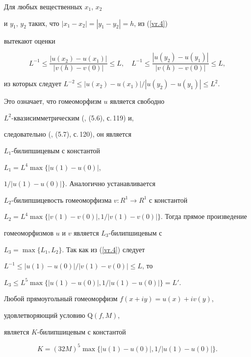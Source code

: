 \begin{pf}


Для любых вещественных $x_1$, $x_2$


и $y_1$, $y_2$ таких, что $|x_1 - x_2| = |y_1 - y_2| =h$, из (\ref{vr.4}) 


вытекают оценки


$$


L^{-1}\leq \frac{|u(x_2) - u(x_1)|}{|v(h) - v(0)|} \leq L,\quad


L^{-1}\leq \frac{|u(y_2) - u(y_1)|}{|v(h) - v(0)|} \leq L,


$$


из которых следует $L^{-2}\leq |u(x_2)-u(x_1)|/|u(y_2)-u(y_1)| \leq L^2$. 


Это означает, что гомеоморфизм $u$ является свободно 


$L^2$-квазисимметрическим (\cite{AsVV}, (5.6), с.\,119) и, 


следовательно (\cite{AsVV}, (5.7), с.\,120), он является 


$L_1$-билипшицевым с константой 


$L_1 = L^4\max\{ |u(1)-u(0)|$,


$1/|u(1)-u(0)|\} $. Аналогично устанавливается 


$L_2$-билипшицевость гомеоморфизма $v: R^1 \to R^1$ с константой 


$L_2 = L^4 \max\{ |v(1)-v(0)|, 1/|v(1)-v(0)|\} $. Тогда прямое произведение 


гомеоморфизмов $u$ и $v$ является $L_3$-билипшицевым с 


$L_3 = \max\{ L_1, L_2\} $. Так как из (\ref{vr.4}) следует


$L^{-1} \leq |u(1) - u(0)|/|v(1) - v(0)| \leq L$, то 


$L_3 \leq L^5 \max\{ |u(1)-u(0)|, 1/|u(1) - u(0)|\} = L'$. 


\end{pf}





\begin{thms}


Любой прямоугольный гомеоморфизм $f(x+iy)=u(x) + iv(y)$, 


удовлетворяющий условию $\mathrm Q(f,M)$,


является $K$-билипшицевым с константой 


$$


K = (32M)^5 \max\{ |u(1)-u(0)|, 1/|u(1)-u(0)|\}.


$$


\end{thms}





